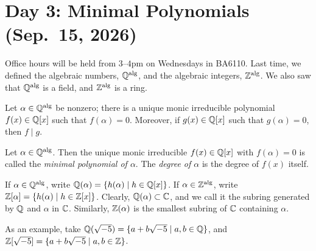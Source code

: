 \section{Day 3: Minimal Polynomials (Sep.\ 15, 2026)}
Office hours will be held from $3$--$4$pm on Wednesdays in BA6110. Last time, we defined the algebraic numbers, $\mathbb Q^{\operatorname{alg}}$, and the algebraic integers, $\operatorname{\mathbb Z^{\operatorname{alg}}}$. %
We also saw that $\operatorname{\mathbb Q^{\operatorname{alg}}}$ is a field, and $\operatorname{\mathbb Z^{\operatorname{alg}}}$ is a ring.

\begin{proposition}
    Let $\alpha \in \operatorname{\mathbb Q^{\operatorname{alg}}}$ be nonzero; there is a unique monic irreducible polynomial $f(x) \in \mathbb Q[x]$ such that $f(\alpha) = 0$. Moreover, if $g(x) \in \mathbb Q[x]$ such that $g(\alpha) = 0$, then $f \mid g$.
\end{proposition}
\begin{definition} \label{defn:minimal_polynomial}
    Let $\alpha \in \operatorname{\mathbb Q^{\operatorname{alg}}}$. Then the unique monic irreducible $f(x) \in \mathbb Q[x]$ with $f(\alpha) = 0$ is called the \textit{minimal polynomial of $\alpha$}. The \textit{degree of $\alpha$} is the degree of $f(x)$ itself.
\end{definition}

If $\alpha \in \operatorname{\mathbb Q^{\operatorname{alg}}}$, write $\mathbb Q(\alpha) = \{h(\alpha) \mid h \in \mathbb Q[x]\}$. If $\alpha \in \operatorname{\mathbb Z^{\operatorname{alg}}}$, write $\mathbb Z[\alpha] = \{h(\alpha) \mid h \in \mathbb Z[x]\}$. Clearly, $\mathbb Q(\alpha) \subset \mathbb C$, and we call it the subring generated by $\mathbb Q$ and $\alpha$ in $\mathbb C$. Similarly, $\mathbb Z(\alpha)$ is the smallest subring of $\mathbb C$ containing $\alpha$.

As an example, take $\mathbb Q(\sqrt{-5}) = \{a + b \sqrt{-5} \mid a, b \in \mathbb Q\}$, and $\mathbb Z[\sqrt{-5}] = \{a + b\sqrt{-5} \mid a, b \in \mathbb Z\}$.

